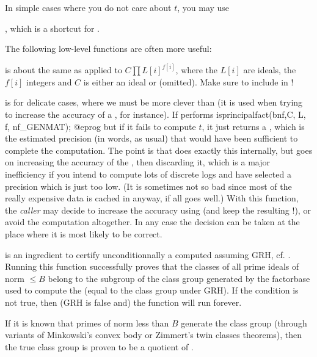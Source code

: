 In simple cases where you do not care about $t$, you may use

, which is a shortcut for
.

The following low-level functions are often more useful:

 is
about the same as  applied to $C \prod L[i]^{f[i]}$,
where the $L[i]$ are ideals, the $f[i]$ integers and $C$ is either an ideal
or  (omitted). Make sure to include  in !

 is
for delicate cases, where we must be more clever than 
(it is used when trying to increase the accuracy of a , for
instance). If performs
\bprog
  isprincipalfact(bnf,C, L, f, nf_GENMAT);
@eprog\noindent
but if it fails to compute $t$, it just returns a , which is the
estimated precision (in words, as usual) that would have been sufficient to
complete the computation. The point is that  does exactly this
internally, but goes on increasing the accuracy of the , then
discarding it, which is a major inefficiency if you intend to compute lots of
discrete logs and have selected a precision which is just too low.
(It is sometimes not so bad since most of the really expensive data is cached
in  anyway, if all goes well.)  With this function, the \emph{caller}
may decide to increase the accuracy using  (and keep the
resulting !), or avoid the computation altogether. In any case the
decision can be taken at the place where it is most likely to be correct.

 is an ingredient to certify
unconditionnally a  computed assuming GRH, cf. .
Running this function successfully proves that the classes of all prime
ideals of norm $\leq B$ belong to the subgroup of the class group generated
by the factorbase used to compute the  (equal to the class group
under GRH). If the condition is not true, then (GRH is false and) the
function will run forever.

If it is known that primes of norm less than $B$ generate the class group
(through variants of Minkowski's convex body or Zimmert's twin classes
theorems), then the true class group is proven to be a quotient of
.

